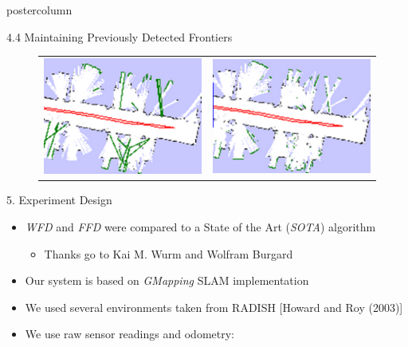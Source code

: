 \begin{beamercolorbox}[center,wd=\textwidth]{postercolumn}
\begin{minipage}[T]{.95\textwidth}
{\begin{block}{4.4 Maintaining Previously Detected Frontiers}
\begin{figure}
\begin{tabular}{p{.35\linewidth}  p{.35\linewidth} }
                  \includegraphics[width=0.6\linewidth]{images/redetecting_bad_example.png}
                  &
                  \includegraphics[width=0.6\linewidth]{images/redetecting_good_example.png}
                \end{tabular}
              \end{figure}
            \end{block}
            \vfill
            \begin{block}{5. Experiment Design}
              \begin{itemize}
                \item \emph{WFD} and \emph{FFD} were compared to a
                State of the Art (\emph{SOTA}) algorithm
					\begin{itemize}
					  \item Thanks go to Kai M. Wurm and Wolfram Burgard
					\end{itemize} 
                \item Our system is based on \emph{GMapping} SLAM implementation
                \item We used several environments taken from RADISH
                [Howard and Roy (2003)]
                \item We use raw sensor readings and odometry:
                	\begin{itemize}

\end{itemize}
\end{itemize}
\end{block}}
\end{minipage}
\end{beamercolorbox}
